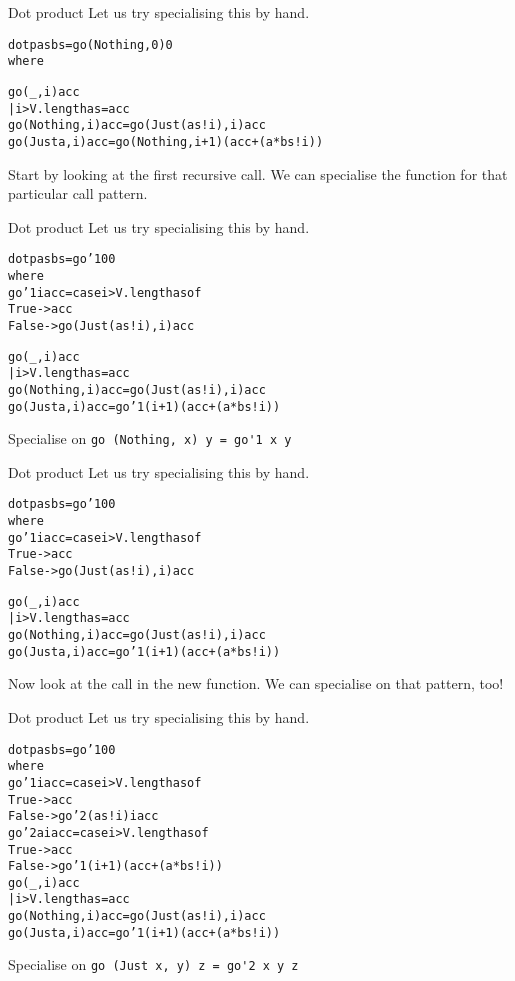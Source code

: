 \documentclass[t]{beamer}
\newcommand{\oomph}[1]{\textcolor[rgb]{0.0,0.5,0.9}{#1}}
\begin{document}
\begin{frame}[fragile]{Dot product}
Let us try specialising this by hand.
\begin{alltt}
dotp as bs = \oomph{go (Nothing, 0) 0}
 where






  go (_, i) acc
   | i > V.length as  = acc
  go (Nothing, i) acc = go (Just (as!i), i) acc
  go (Just a,  i) acc = go (Nothing, i+1) (acc + (a*bs!i))
\end{alltt}
Start by looking at the first recursive call.
We can specialise the function for that particular call pattern.
\end{frame}

\begin{frame}[fragile]{Dot product}
Let us try specialising this by hand.
\begin{alltt}
dotp as bs = \oomph{go'1 0 0}
 where
  \oomph{go'1 i acc = case i > V.length as of
   True  -> acc
   False -> go (Just (as!i), i) acc}



  go (_, i) acc
   | i > V.length as  = acc
  go (Nothing, i) acc = go (Just (as!i), i) acc
  go (Just a,  i) acc = \oomph{go'1 (i + 1) (acc + (a * bs!i))}
\end{alltt}
Specialise on \verb/go (Nothing, x) y = go'1 x y/
\end{frame}

\begin{frame}[fragile]{Dot product}
Let us try specialising this by hand.
\begin{alltt}
dotp as bs = go'1 0 0
 where
  go'1 i acc = case i > V.length as of
   True  -> acc
   False -> \oomph{go (Just (as!i), i) acc}



  go (_, i) acc
   | i > V.length as  = acc
  go (Nothing, i) acc = go (Just (as!i), i) acc
  go (Just a,  i) acc = go'1 (i + 1) (acc + (a * bs!i))
\end{alltt}
Now look at the call in the new function. We can specialise on that pattern, too!
\end{frame}

\begin{frame}[fragile]{Dot product}
Let us try specialising this by hand.
\begin{alltt}
dotp as bs = go'1 0 0
 where
  go'1 i acc = case i > V.length as of
   True  -> acc
   False -> \oomph{go'2 (as!i) i acc}
  \oomph{go'2 a i acc = case i > V.length as of
   True  -> acc
   False -> go'1 (i + 1) (acc + (a * bs!i))}
  go (_, i) acc
   | i > V.length as  = acc
  go (Nothing, i) acc = go (Just (as!i), i) acc
  go (Just a,  i) acc = go'1 (i + 1) (acc + (a * bs!i))
\end{alltt}
Specialise on \verb/go (Just x, y) z = go'2 x y z/
\end{frame}
\end{document}
